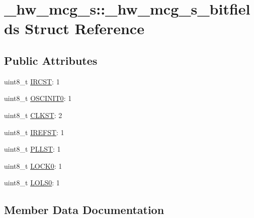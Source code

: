 \hypertarget{struct__hw__mcg__s_1_1__hw__mcg__s__bitfields}{}\section{\+\_\+hw\+\_\+mcg\+\_\+s\+:\+:\+\_\+hw\+\_\+mcg\+\_\+s\+\_\+bitfields Struct Reference}
\label{struct__hw__mcg__s_1_1__hw__mcg__s__bitfields}
\subsection*{Public Attributes}
\begin{DoxyCompactItemize}
\item 
uint8\+\_\+t \hyperlink{struct__hw__mcg__s_1_1__hw__mcg__s__bitfields_a0f042f02d35821ce5286f9830ee3644f}{I\+R\+C\+ST}\+: 1
\item 
uint8\+\_\+t \hyperlink{struct__hw__mcg__s_1_1__hw__mcg__s__bitfields_aeec559e877eea6e7f6b4fa502d947356}{O\+S\+C\+I\+N\+I\+T0}\+: 1
\item 
uint8\+\_\+t \hyperlink{struct__hw__mcg__s_1_1__hw__mcg__s__bitfields_aa68a73bf9d538909791236965d537ac8}{C\+L\+K\+ST}\+: 2
\item 
uint8\+\_\+t \hyperlink{struct__hw__mcg__s_1_1__hw__mcg__s__bitfields_a3eaea86ecfe3bd1cc9129149dbbbbd1a}{I\+R\+E\+F\+ST}\+: 1
\item 
uint8\+\_\+t \hyperlink{struct__hw__mcg__s_1_1__hw__mcg__s__bitfields_a9bf5add092474fd78fbeb59cf99e6d91}{P\+L\+L\+ST}\+: 1
\item 
uint8\+\_\+t \hyperlink{struct__hw__mcg__s_1_1__hw__mcg__s__bitfields_ac5339c27a9548ec3116a73a10bb78773}{L\+O\+C\+K0}\+: 1
\item 
uint8\+\_\+t \hyperlink{struct__hw__mcg__s_1_1__hw__mcg__s__bitfields_ada7218109c37055adeca4bec4100f69b}{L\+O\+L\+S0}\+: 1
\end{DoxyCompactItemize}


\subsection{Member Data Documentation}
